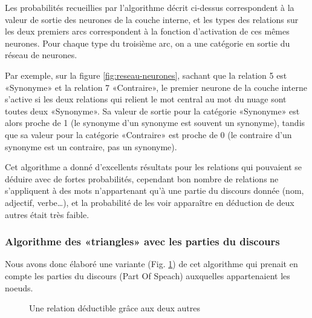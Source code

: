 \documentclass[a4paper,11pt,french]{article}
\begin{document}
Les probabilités recueillies par l'algorithme décrit ci-dessus correspondent à la valeur de sortie des neurones de la couche interne, et les
types des relations sur les deux premiers arcs correspondent à la fonction d'activation de ces mêmes neurones. Pour chaque type du troisième
arc, on a une catégorie en sortie du réseau de neurones.

Par exemple, sur la figure \ref{fig:reseau-neurones}, sachant que la relation 5 est «Synonyme» et la relation 7 «Contraire», le premier
neurone de la couche interne s'active si les deux relations qui relient le mot central au mot du nuage sont toutes deux «Synonyme». Sa
valeur de sortie pour la catégorie «Synonyme» est alors proche de 1 (le synonyme d'un synonyme est souvent un synonyme), tandis que sa
valeur pour la catégorie «Contraire» est proche de 0 (le contraire d'un synonyme est un contraire, pas un synonyme).

Cet algorithme a donné d'excellents résultats pour les relations qui pouvaient se déduire avec de fortes probabilités, cependant bon nombre
de relations ne s'appliquent à des mots n'appartenant qu'à une partie du discours donnée (nom, adjectif, verbe…), et la probabilité de les
voir apparaître en déduction de deux autres était très faible.

\subsubsection{Algorithme des «triangles» avec les parties du discours}

Nous avons donc élaboré une variante (Fig. \ref{fig:algo-triangles-pos}) de cet algorithme qui prenait en compte les parties du discours
(Part Of Speach) auxquelles appartenaient les noeuds.

\begin{figure}[ht]
  \centering
  \begin{center}
  \end{center}
  \caption{Une relation déductible grâce aux deux autres}
  \label{fig:algo-triangles-pos}
\end{figure}
\end{document}
